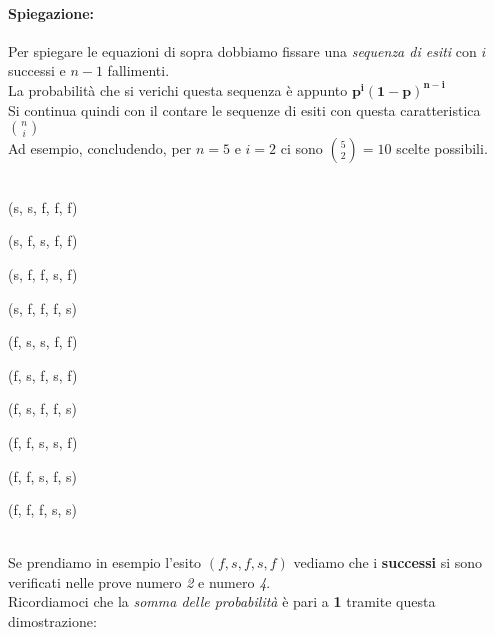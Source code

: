 \documentclass[]{article}
\begin{document}
    \paragraph{Spiegazione:} Per spiegare le equazioni di sopra dobbiamo fissare una \textit{sequenza di esiti} con $i$ successi e $n - 1$ fallimenti. \\
    La probabilità che si verichi questa sequenza è appunto $\boldsymbol{p^i(1-p)^{n-i}}$ \\
    Si continua quindi con il contare le sequenze di esiti con questa caratteristica $\binom{n}{i}$ \\ 
    Ad esempio, concludendo, per $n = 5$ e $i = 2$ ci sono $\binom{5}{2} = 10$ scelte possibili. \\ \\
    \begin{minipage}{0.2\textwidth}
        (s, s, f, f, f)
    \end{minipage}
    \begin{minipage}{0.2\textwidth}
        (s, f, s, f, f)
    \end{minipage}
    \begin{minipage}{0.2\textwidth}
        (s, f, f, s, f)
    \end{minipage}
    \begin{minipage}{0.2\textwidth}
        (s, f, f, f, s)
    \end{minipage}
    \begin{minipage}{0.2\textwidth}
        (f, s, s, f, f)
    \end{minipage}
    \begin{minipage}{0.2\textwidth}
        (f, s, f, s, f)
    \end{minipage}
    \begin{minipage}{0.2\textwidth}
        (f, s, f, f, s)
    \end{minipage}
    \begin{minipage}{0.2\textwidth}
        (f, f, s, s, f)
    \end{minipage}
    \begin{minipage}{0.2\textwidth}
        (f, f, s, f, s)
    \end{minipage}
    \begin{minipage}{0.2\textwidth}
        (f, f, f, s, s)
    \end{minipage} \\
    \linebreak
    Se prendiamo in esempio l'esito $(f, s, f, s, f)$ vediamo che i \textbf{successi} 
    si sono verificati nelle prove numero \textit{2} e numero \textit{4}. \\
    Ricordiamoci che la \textit{somma delle probabilità} è pari a \textbf{1} tramite questa dimostrazione:
\end{document}
